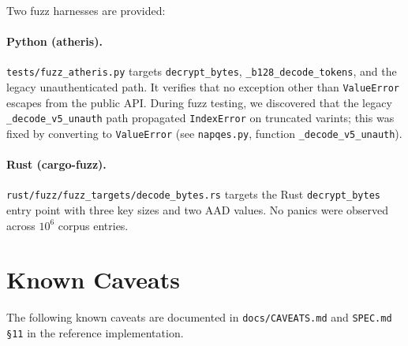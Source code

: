 \documentclass[11pt,a4paper]{article}
\begin{document}
Two fuzz harnesses are provided:

\paragraph{Python (atheris).}
\texttt{tests/fuzz\_atheris.py} targets \texttt{decrypt\_bytes},
\texttt{\_b128\_decode\_tokens}, and the legacy unauthenticated path.  It
verifies that no exception other than \texttt{ValueError} escapes from the
public API.  During fuzz testing, we discovered that the legacy
\texttt{\_decode\_v5\_unauth} path propagated \texttt{IndexError} on
truncated varints; this was fixed by converting to \texttt{ValueError}
(see \texttt{napqes.py}, function \texttt{\_decode\_v5\_unauth}).

\paragraph{Rust (cargo-fuzz).}
\texttt{rust/fuzz/fuzz\_targets/decode\_bytes.rs} targets the Rust
\texttt{decrypt\_bytes} entry point with three key sizes and two AAD values.
No panics were observed across $10^6$ corpus entries.

\section{Known Caveats}
\label{sec:caveats}

The following known caveats are documented in \texttt{docs/CAVEATS.md} and
\texttt{SPEC.md \S11} in the reference implementation.
\end{document}
